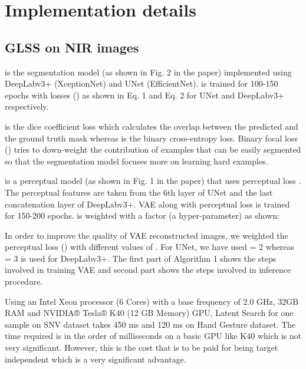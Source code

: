 \documentclass[runningheads]{llncs}
\begin{document}
\section{Implementation details}
\subsection{GLSS on NIR images}
 is the segmentation model (as shown in Fig. 2 in the paper) implemented using DeepLabv3+ (XceptionNet) and UNet (EfficientNet).  is trained for 100-150 epochs with losses () as shown in Eq. 1 and Eq. 2  for UNet  and DeepLabv3+ respectively.




 is the dice coefficient loss which calculates the overlap between the predicted and the ground truth mask whereas  is the binary cross-entropy loss.
Binary focal loss () tries to down-weight the contribution
of examples that can be easily segmented so that the segmentation model focuses  more on learning hard examples.

 is a perceptual model (as shown in Fig. 1 in the paper) that uses perceptual loss . The perceptual features are taken from the 6th layer of UNet and the last concatenation layer of DeepLabv3+. VAE along with perceptual loss  is trained for  150-200 epochs.  is weighted  with a factor  (a hyper-parameter) as shown:

In order to improve the quality of VAE reconstructed images, we weighted the perceptual loss () with different values of .
For UNet, we have used  = 2 whereas   = 3 is used for DeepLabv3+.
The first part of Algorithm 1 shows the steps involved in training VAE and second part shows the steps involved in inference procedure. 

Using an Intel Xeon processor (6 Cores) with a base frequency of 2.0 GHz, 32GB RAM and NVIDIA® Tesla® K40 (12 GB Memory) GPU, Latent Search for one sample on SNV dataset takes 450 ms and 120 ms on Hand Gesture dataset. The time required is in the order of milliseconds on a basic GPU like K40 which is not very significant. However, this is the cost that is to be paid for being target independent which is a very significant advantage.
\end{document}
